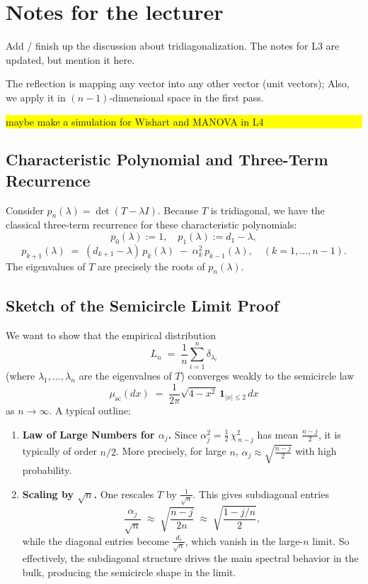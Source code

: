 \documentclass[letterpaper,11pt,oneside,reqno]{article}
\numberwithin{equation}{section}
\theoremstyle{definition}
\newenvironment{lnotes}{\section*{Notes for the lecturer}}{}
\begin{document}
\begin{lnotes}

	Add / finish up the discussion about tridiagonalization. The notes for L3 are updated, but
	mention it here.

	The reflection is mapping any vector into any other vector (unit vectors);
	Also, we apply it in $(n-1)$-dimensional space in the first pass.


\colorbox{yellow}{\parbox{.7\textwidth}{maybe make a simulation for Wishart and MANOVA in L4}}


\subsection{Characteristic Polynomial and Three-Term Recurrence}

Consider \(p_n(\lambda) = \det(T - \lambda I)\).  Because \(T\) is tridiagonal, we have the classical three-term recurrence for these characteristic polynomials:
\[
  p_0(\lambda) := 1,\quad
  p_1(\lambda) := d_1 - \lambda,
\]
\[
  p_{k+1}(\lambda)
  \;=\;
  (d_{k+1} - \lambda)\,p_k(\lambda)
  \;-\;\alpha_k^2\,p_{k-1}(\lambda),
  \quad
  (k=1,\dots,n-1).
\]
The eigenvalues of \(T\) are precisely the roots of \(p_n(\lambda)\).

\subsection{Sketch of the Semicircle Limit Proof}

We want to show that the empirical distribution
\[
  L_n
  \;=\;
  \frac{1}{n}\sum_{i=1}^n \delta_{\lambda_i}
\]
(where \(\lambda_1,\dots,\lambda_n\) are the eigenvalues of \(T\)) converges weakly to the semicircle law
\[
  \mu_{\mathrm{sc}}(dx)
  \;=\;
  \frac{1}{2\pi}\sqrt{4 - x^2}\,\mathbf{1}_{|x|\le 2}\,dx
\]
as \(n\to\infty\).  A typical outline:

\begin{enumerate}[1.]
\item \textbf{Law of Large Numbers for \(\alpha_j\).}
   Since \(\alpha_j^2 = \tfrac12\,\chi^2_{\,n-j}\) has mean \(\tfrac{n-j}{2}\), it is typically of order \(n/2\).  More precisely, for large \(n\), \(\alpha_j \approx \sqrt{\tfrac{n-j}{2}}\) with high probability.

\item \textbf{Scaling by \(\sqrt{n}\).}
   One rescales \(T\) by \(\tfrac{1}{\sqrt{n}}\).  This gives subdiagonal entries
   \[
     \frac{\alpha_j}{\sqrt{n}}
     \;\approx\;
     \sqrt{\frac{n-j}{2n}}
     \;\approx\;
     \sqrt{\frac{1 - j/n}{2}},
   \]
   while the diagonal entries become \(\tfrac{d_i}{\sqrt{n}}\), which vanish in the large-\(n\) limit.  So effectively, the subdiagonal structure drives the main spectral behavior in the bulk, producing the semicircle shape in the limit.


\end{enumerate}
\end{lnotes}
\end{document}
